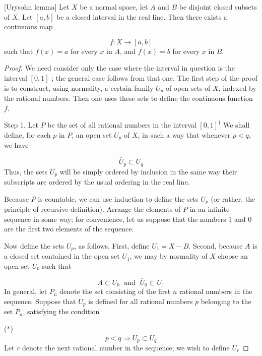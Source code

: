 \begin{theorem}
\label{thm:\thetheorem}[Urysohn lemma]
 Let \(X\) be a normal space, let \(A\) and \(B\) be disjoint closed subsets of \(X\). Let \([ {a,b}]\) be a closed interval in the real line. Then there exists a continuous map

\[
f : X \rightarrow [ {a,b}]
\]
such that \(f(x) = a\) for every \(x\) in \(A\), and \(f(x) = b\) for every \(x\) in \(B\).

\end{theorem}
\begin{proof}
We need consider only the case where the interval in question is the interval \([ {0,1}]\) ; the general case follows from that one. The first step of the proof is to construct, using normality, a certain family \(U_{p}\) of open sets of \(X\), indexed by the rational numbers. Then one uses these sets to define the continuous function \(f\).

Step 1. Let \(P\) be the set of all rational numbers in the interval \([ 0,1] ^{\dagger}\) We shall define, for each \(p\) in \(P\), an open set \(U_{p}\) of \(X\), in such a way that whenever \(p < q\), we have

\[
\bar{U}_{p} \subset {U}_{q}
\]
Thus, the sets \(U_{p}\) will be simply ordered by inclusion in the same way their subscripts are ordered by the usual ordering in the real line.

Because \(P\) is countable, we can use induction to define the sets \(U_{p}\) (or rather, the principle of recursive definition). Arrange the elements of \(P\) in an infinite sequence in some way; for convenience, let us suppose that the numbers 1 and 0 are the first two elements of the sequence.

Now define the sets \(U_{p}\), as follows. First, define \(U_{1} = X - B\). Second, because \(A\) is a closed set contained in the open set \(U_{1}\), we may by normality of \(X\) choose an open set \(U_{0}\) such that

\[
A \subset {U}_{0}\;\text{ and }\;\bar{U}_{0} \subset {U}_{1}
\]
In general, let \(P_{n}\) denote the set consisting of the first \(n\) rational numbers in the sequence. Suppose that \(U_{p}\) is defined for all rational numbers \(p\) belonging to the set \(P_{n}\), satisfying the condition

(*)
\[
p < q \Rightarrow {\bar{U}}_{p} \subset {U}_{q}
\]
Let \(r\) denote the next rational number in the sequence; we wish to define \(U_{r}\)


\end{proof}
